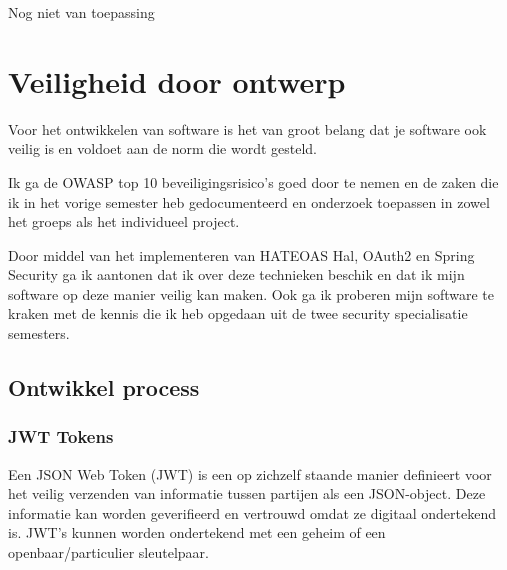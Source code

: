 Nog niet van toepassing








\newpage
\section{Veiligheid door ontwerp}\label{sec:veiligheid-door-ontwerp}

Voor het ontwikkelen van software is het van groot belang dat je software ook veilig is en voldoet aan de norm die
wordt gesteld.

Ik ga de OWASP top 10 beveiligingsrisico's goed door te nemen en de zaken die ik in het vorige semester heb
gedocumenteerd en onderzoek toepassen in zowel het groeps als het individueel project.

Door middel van het implementeren van HATEOAS Hal, OAuth2 en Spring Security ga ik aantonen dat ik over deze
technieken beschik en dat ik mijn software op deze manier veilig kan maken.
Ook ga ik proberen mijn software te kraken met de kennis die ik heb opgedaan uit de twee security specialisatie
semesters.


\subsection{Ontwikkel process}
\subsubsection{JWT Tokens}
Een JSON Web Token (JWT) is een op zichzelf staande manier definieert voor het veilig verzenden van informatie tussen partijen als een JSON-object.
Deze informatie kan worden geverifieerd en vertrouwd omdat ze digitaal ondertekend is.
JWT's kunnen worden ondertekend met een geheim of een openbaar/particulier sleutelpaar.

